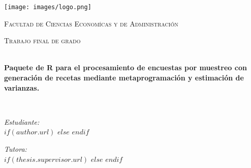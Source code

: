 \frontmatter %

\pagestyle{plain} %


\begin{titlepage}
\begin{center}

\vspace*{.06\textheight}
\texttt{[image: images/logo.png]} %
{\scshape\LARGE \univname\par}\vspace{1.5cm} %
{\scshape\LARGE Facultad de Ciencias Economícas y de Administración\par}\vspace{1.5cm} %
\textsc{\Large Trabajo final de grado}\\[0.5cm] %

\HRule \\[0.4cm] %
{\huge \bfseries \ttitle\par}\vspace{0.4cm} %
{\bfseries Paquete de R para el procesamiento de encuestas por muestreo con generación de recetas mediante metaprogramación y estimación de varianzas.\par}\vspace{0.4cm} %
\HRule \\[1.5cm] %
 
\begin{minipage}[t]{0.4\textwidth}
\begin{flushleft} \large
\emph{Estudiante:}\\
$if(author.url)$
\href{$author.url$}{\authorname} %
$else$
\authorname
$endif$
\end{flushleft}
\end{minipage}
\begin{minipage}[t]{0.4\textwidth}
\begin{flushright} \large
\emph{Tutora:} \\
$if(thesis.supervisor.url)$%
\href{$thesis.supervisor.url$}{\supname} %
$else$%
\supname
$endif$
\end{flushright}
\end{minipage}\\[3cm]
 

\end{center}
\end{titlepage}
